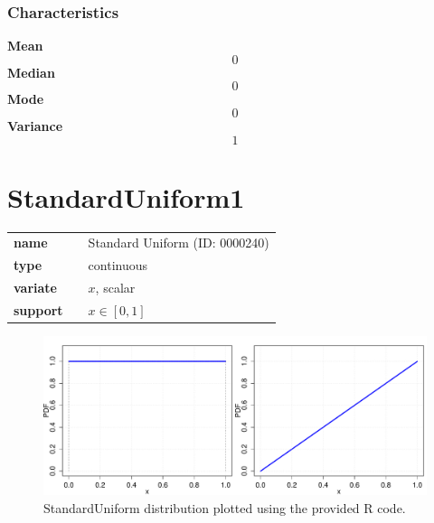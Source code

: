 \subsubsection*{Characteristics}
\smallskip \noindent \hspace{.2cm} \textbf{Mean} 
\begin{equation*}0\end{equation*}
\smallskip \noindent \hspace{.2cm} \textbf{Median} 
\begin{equation*}0\end{equation*}
\smallskip \noindent \hspace{.2cm} \textbf{Mode} 
\begin{equation*}0\end{equation*}
\smallskip \noindent \hspace{.2cm} \textbf{Variance} 
\begin{equation*}1\end{equation*}
\smallskip
\section*{StandardUniform1} 

  \bigskip 

\begin{tabular}{p{2cm}cl}
\textbf{name} & & Standard Uniform (ID: 0000240)\\ 
 
\textbf{type} & & continuous \\ 

\textbf{variate} & & $x$, scalar \\ 

\textbf{support} & & $x \in [0,1]$
\end{tabular}

\begin{figure}[ht!]
\centering
  \includegraphics[width=140mm]{pics/StandardUniform.pdf}
 \caption{StandardUniform distribution plotted using the provided R code.}
 \label{fig:StandardUniform}
\end{figure}

